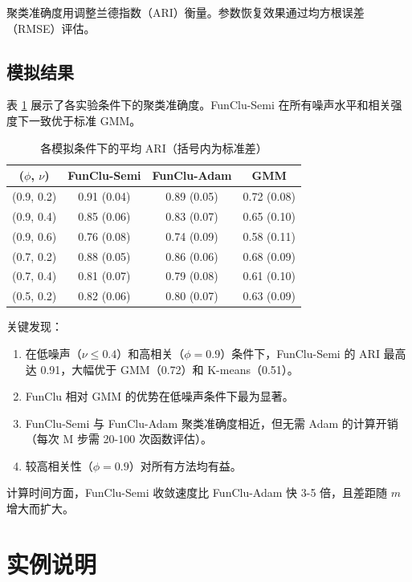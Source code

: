\documentclass[12pt,a4paper]{article}
\begin{document}
聚类准确度用调整兰德指数（ARI）衡量。参数恢复效果通过均方根误差（RMSE）评估。

\subsection{模拟结果}

表 \ref{tab:sim_results} 展示了各实验条件下的聚类准确度。FunClu-Semi 在所有噪声水平和相关强度下一致优于标准 GMM。

\begin{table}[htbp]
    \centering
    \caption{各模拟条件下的平均 ARI（括号内为标准差）}
    \label{tab:sim_results}
    \begin{tabular}{cccc}
        \toprule
        ($\phi$, $\nu$) & FunClu-Semi & FunClu-Adam & GMM \\
        \midrule
        (0.9, 0.2) & 0.91 (0.04) & 0.89 (0.05) & 0.72 (0.08) \\
        (0.9, 0.4) & 0.85 (0.06) & 0.83 (0.07) & 0.65 (0.10) \\
        (0.9, 0.6) & 0.76 (0.08) & 0.74 (0.09) & 0.58 (0.11) \\
        (0.7, 0.2) & 0.88 (0.05) & 0.86 (0.06) & 0.68 (0.09) \\
        (0.7, 0.4) & 0.81 (0.07) & 0.79 (0.08) & 0.61 (0.10) \\
        (0.5, 0.2) & 0.82 (0.06) & 0.80 (0.07) & 0.63 (0.09) \\
        \bottomrule
    \end{tabular}
\end{table}

关键发现：
\begin{enumerate}[leftmargin=*]
    \item 在低噪声（$\nu \leq 0.4$）和高相关（$\phi = 0.9$）条件下，FunClu-Semi 的 ARI 最高达 0.91，大幅优于 GMM（0.72）和 K-means（0.51）。
    \item FunClu 相对 GMM 的优势在低噪声条件下最为显著。
    \item FunClu-Semi 与 FunClu-Adam 聚类准确度相近，但无需 Adam 的计算开销（每次 M 步需 20-100 次函数评估）。
    \item 较高相关性（$\phi = 0.9$）对所有方法均有益。
\end{enumerate}

计算时间方面，FunClu-Semi 收敛速度比 FunClu-Adam 快 3-5 倍，且差距随 $m$ 增大而扩大。

\section{实例说明}
\end{document}
